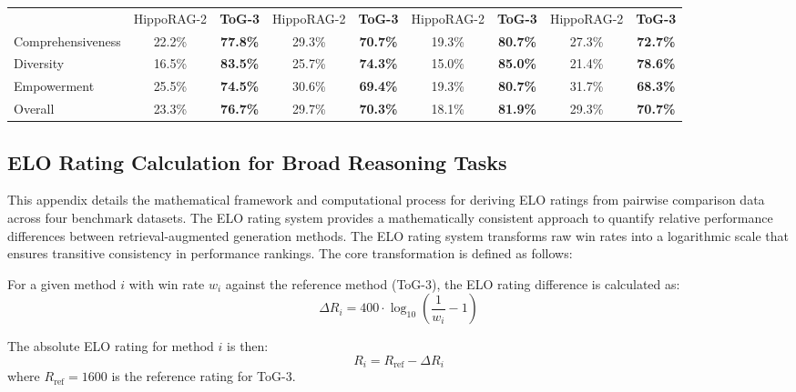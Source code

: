 \begin{table}[t]
{\begin{tabular}{@{}l|cccccccc@{}}
                      & HippoRAG-2 & \textbf{ToG-3} & HippoRAG-2 & \textbf{ToG-3} & HippoRAG-2 & \textbf{ToG-3} & HippoRAG-2 & \textbf{ToG-3} \\
 \cmidrule(lr){2-3} \cmidrule(lr){4-5} \cmidrule(lr){6-7} \cmidrule(lr){8-9}
Comprehensiveness      & 22.2\%      & \textbf{77.8\%}     & 29.3\%      & \textbf{70.7\%}     & 19.3\%      & \textbf{80.7\%}     & 27.3\%      & \textbf{72.7\%}     \\
Diversity              & 16.5\%      & \textbf{83.5\%}     & 25.7\%      & \textbf{74.3\%}     & 15.0\%      & \textbf{85.0\%}     & 21.4\%      & \textbf{78.6\%}     \\
Empowerment            & 25.5\%      & \textbf{74.5\%}     & 30.6\%      & \textbf{69.4\%}     & 19.3\%      & \textbf{80.7\%}     & 31.7\%      & \textbf{68.3\%}     \\
Overall                & 23.3\%      & \textbf{76.7\%}     & 29.7\%      & \textbf{70.3\%}     & 18.1\%      & \textbf{81.9\%}     & 29.3\%      & \textbf{70.7\%}     \\
\bottomrule
\end{tabular}
}
\end{table}

\subsection{ELO Rating Calculation for Broad Reasoning Tasks}
\label{appendix:elo_calculation}

This appendix details the mathematical framework and computational process for deriving ELO ratings from pairwise comparison data across four benchmark datasets. The ELO rating system provides a mathematically consistent approach to quantify relative performance differences between retrieval-augmented generation methods.
The ELO rating system transforms raw win rates into a logarithmic scale that ensures transitive consistency in performance rankings. The core transformation is defined as follows:

For a given method $i$ with win rate $w_i$ against the reference method (ToG-3), the ELO rating difference is calculated as:
\[
\Delta R_i = 400 \cdot \log_{10}\left(\frac{1}{w_i} - 1\right)
\]

The absolute ELO rating for method $i$ is then:
\[
R_i = R_{\text{ref}} - \Delta R_i
\]
where $R_{\text{ref}} = 1600$ is the reference rating for ToG-3.

